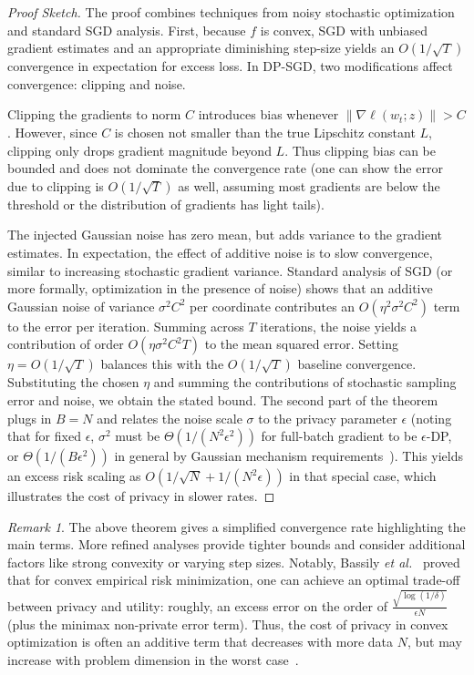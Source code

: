 \documentclass[11pt]{article}
\theoremstyle{remark}
\newtheorem{remark}{Remark}
\theoremstyle{definition}
\theoremstyle{plain}
\begin{document}
\begin{proof}[Proof Sketch]
The proof combines techniques from noisy stochastic optimization and standard SGD analysis. First, because $f$ is convex, SGD with unbiased gradient estimates and an appropriate diminishing step-size yields an $O(1/\sqrt{T})$ convergence in expectation for excess loss. In DP-SGD, two modifications affect convergence: clipping and noise.

Clipping the gradients to norm $C$ introduces bias whenever $\|\nabla \ell(w_t; z)\| > C$. However, since $C$ is chosen not smaller than the true Lipschitz constant $L$, clipping only drops gradient magnitude beyond $L$. Thus clipping bias can be bounded and does not dominate the convergence rate (one can show the error due to clipping is $O(1/\sqrt{T})$ as well, assuming most gradients are below the threshold or the distribution of gradients has light tails).

The injected Gaussian noise has zero mean, but adds variance to the gradient estimates. In expectation, the effect of additive noise is to slow convergence, similar to increasing stochastic gradient variance. Standard analysis of SGD (or more formally, optimization in the presence of noise) shows that an additive Gaussian noise of variance $\sigma^2 C^2$ per coordinate contributes an $O(\eta^2 \sigma^2 C^2)$ term to the error per iteration. Summing across $T$ iterations, the noise yields a contribution of order $O(\eta \sigma^2 C^2 T)$ to the mean squared error. Setting $\eta = O(1/\sqrt{T})$ balances this with the $O(1/\sqrt{T})$ baseline convergence. Substituting the chosen $\eta$ and summing the contributions of stochastic sampling error and noise, we obtain the stated bound. The second part of the theorem plugs in $B=N$ and relates the noise scale $\sigma$ to the privacy parameter $\epsilon$ (noting that for fixed $\epsilon$, $\sigma^2$ must be $\Theta(1/(N^2 \epsilon^2))$ for full-batch gradient to be $\epsilon$-DP, or $\Theta(1/(B \epsilon^2))$ in general by Gaussian mechanism requirements~\cite{DworkRoth2014}). This yields an excess risk scaling as $O(1/\sqrt{N} + 1/(N^2 \epsilon))$ in that special case, which illustrates the cost of privacy in slower rates.
\end{proof}

\begin{remark}
The above theorem gives a simplified convergence rate highlighting the main terms. More refined analyses provide tighter bounds and consider additional factors like strong convexity or varying step sizes. Notably, Bassily \textit{et al.}~\cite{Bassily2014} proved that for convex empirical risk minimization, one can achieve an optimal trade-off between privacy and utility: roughly, an excess error on the order of $\frac{\sqrt{\log(1/\delta)}}{\epsilon N}$ (plus the minimax non-private error term). Thus, the cost of privacy in convex optimization is often an additive term that decreases with more data $N$, but may increase with problem dimension in the worst case~\cite{Bassily2014}.
\end{remark}
\end{document}
